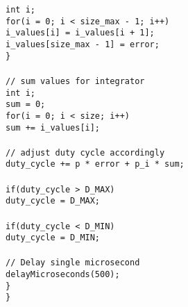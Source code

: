 \documentclass[a4paper, 12pt]{article}
\begin{document}
\begin{appendices}
	\texttt{\hspace*{3em}int i;} \\\noindent
	\texttt{\hspace*{3em}for(i = 0; i < size\_max - 1; i++)} \\\noindent
	\texttt{\hspace*{3em}i\_values[i] = i\_values[i + 1];} \\\noindent
	\texttt{\hspace*{3em}i\_values[size\_max - 1] = error;} \\\noindent
	\texttt{\hspace*{2em}\}} \\\noindent
	\texttt{ \\\noindent}
	\texttt{\hspace*{2em}// sum values for integrator} \\\noindent
	\texttt{\hspace*{2em}int i;} \\\noindent
	\texttt{\hspace*{2em}sum = 0;} \\\noindent
	\texttt{\hspace*{2em}for(i = 0; i < size; i++)} \\\noindent
	\texttt{\hspace*{2em}sum += i\_values[i];} \\\noindent
	\texttt{\hspace*{2em}\\\noindent}
	\texttt{\hspace*{2em}// adjust duty cycle accordingly} \\\noindent
	\texttt{\hspace*{2em}duty\_cycle += p * error + p\_i * sum;} \\\noindent
	\texttt{ \\\noindent}
	\texttt{\hspace*{2em}if(duty\_cycle > D\_MAX)} \\\noindent
	\texttt{\hspace*{3em}duty\_cycle = D\_MAX;} \\\noindent
	\texttt{ \\\noindent}
	\texttt{\hspace*{2em}if(duty\_cycle < D\_MIN)} \\\noindent
	\texttt{\hspace*{3em}duty\_cycle = D\_MIN;} \\\noindent
	\texttt{ \\\noindent}
	\texttt{\hspace*{2em}// Delay single microsecond} \\\noindent
	\texttt{\hspace*{2em}delayMicroseconds(500);} \\\noindent
	\texttt{\hspace*{1em}\}}\\\noindent
        \texttt{\}} \\\noindent
        \texttt{ \\\noindent}


\end{appendices}
\end{document}
